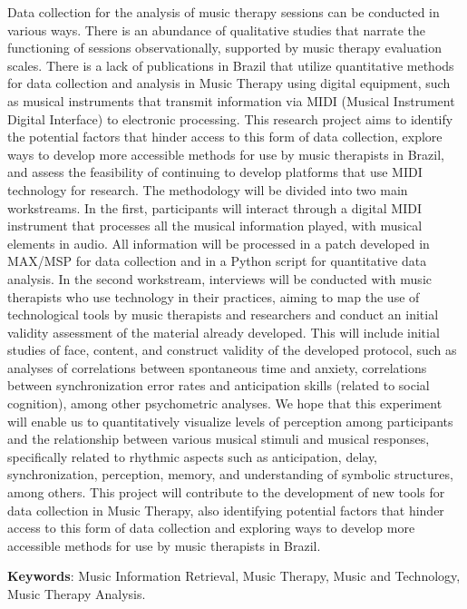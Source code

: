
     
     Data collection for the analysis of music therapy sessions can be conducted in various ways. There is an abundance of qualitative studies that narrate the functioning of sessions observationally, supported by music therapy evaluation scales. There is a lack of publications in Brazil that utilize quantitative methods for data collection and analysis in Music Therapy using digital equipment, such as musical instruments that transmit information via MIDI (Musical Instrument Digital Interface) to electronic processing. This research project aims to identify the potential factors that hinder access to this form of data collection, explore ways to develop more accessible methods for use by music therapists in Brazil, and assess the feasibility of continuing to develop platforms that use MIDI technology for research. The methodology will be divided into two main workstreams. In the first, participants will interact through a digital MIDI instrument that processes all the musical information played, with musical elements in audio. All information will be processed in a patch developed in MAX/MSP for data collection and in a Python script for quantitative data analysis. In the second workstream, interviews will be conducted with music therapists who use technology in their practices, aiming to map the use of technological tools by music therapists and researchers and conduct an initial validity assessment of the material already developed. This will include initial studies of face, content, and construct validity of the developed protocol, such as analyses of correlations between spontaneous time and anxiety, correlations between synchronization error rates and anticipation skills (related to social cognition), among other psychometric analyses. We hope that this experiment will enable us to quantitatively visualize levels of perception among participants and the relationship between various musical stimuli and musical responses, specifically related to rhythmic aspects such as anticipation, delay, synchronization, perception, memory, and understanding of symbolic structures, among others. This project will contribute to the development of new tools for data collection in Music Therapy, also identifying potential factors that hinder access to this form of data collection and exploring ways to develop more accessible methods for use by music therapists in Brazil.
      
      
      
     \textbf{Keywords}: Music Information Retrieval, Music Therapy, Music and Technology, Music Therapy Analysis.




     \setcounter{page}{4}  %

  \newpage